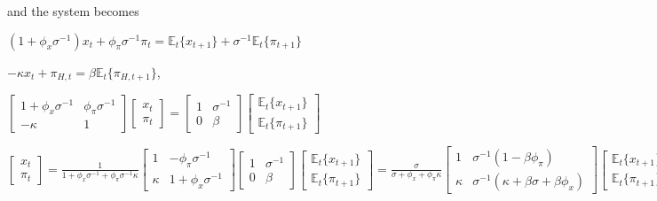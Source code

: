 \documentclass[
]{article}
\begin{document}
and the system becomes

\(\displaystyle (1+\phi_x \sigma^{-1})x_t +\phi_\pi \sigma^{-1}\pi_{t} = \mathbb{E}_t\{x_{t+1}\} +\sigma^{-1}\mathbb{E}_t\{\pi_{t+1}\}\)

\(-\kappa x_t +\pi_{H,t}=\beta \mathbb{E}_t\{ \pi_{H,t+1}\}\),

\(\displaystyle \left[ \begin{matrix} 1+\phi_x \sigma^{-1} & \phi_\pi \sigma^{-1}\\ -\kappa & 1 \end{matrix} \right] \left[ \begin{matrix} x_t\\ \pi_t \end{matrix} \right] = \left[ \begin{matrix} 1 & \sigma^{-1} \\ 0 & \beta \end{matrix} \right] \left[ \begin{matrix} \mathbb{E}_t\{x_{t+1} \}\\ \mathbb{E}_t \{\pi_{t+1} \} \end{matrix} \right]\)

\(\displaystyle \left[ \begin{matrix} x_t\\ \pi_t \end{matrix} \right] = \frac{1}{1+\phi_x \sigma^{-1}+ \phi_\pi \sigma^{-1} \kappa} \left[ \begin{matrix} 1 & -\phi_\pi \sigma^{-1}\\ \kappa & 1+\phi_x \sigma^{-1} \end{matrix} \right] \left[ \begin{matrix} 1 & \sigma^{-1} \\ 0 & \beta \end{matrix} \right] \left[ \begin{matrix} \mathbb{E}_t\{x_{t+1} \}\\ \mathbb{E}_t \{\pi_{t+1} \} \end{matrix} \right]=\frac{\sigma}{\sigma+\phi_x + \phi_\pi \kappa}\left[ \begin{matrix} 1& \sigma^{-1}(1-\beta \phi_\pi)\\ \kappa & \sigma^{-1}(\kappa+\beta \sigma+\beta\phi_x) \end{matrix} \right] \left[ \begin{matrix} \mathbb{E}_t\{x_{t+1} \}\\ \mathbb{E}_t \{\pi_{t+1} \} \end{matrix} \right]\)
\end{document}
